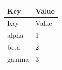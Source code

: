 \documentclass{article}
\begin{document}
\begin{longtable}{|l|l|}
  \hline
  Key & Value \\ \hline
  \endfirsthead
  \hline
  Key & Value \\ \hline
  \endhead
  alpha & 1 \\
  beta & 2 \\
  gamma & 3 \\
  \hline
\end{longtable}
\end{document}
